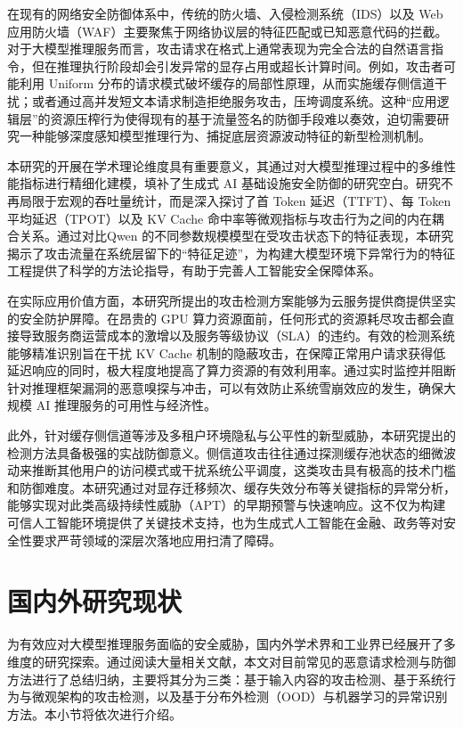 \documentclass[master, vlined]{DissertUESTC}
\begin{document}
	在现有的网络安全防御体系中，传统的防火墙、入侵检测系统（IDS）以及 Web 应用防火墙（WAF）主要聚焦于网络协议层的特征匹配或已知恶意代码的拦截。对于大模型推理服务而言，攻击请求在格式上通常表现为完全合法的自然语言指令，但在推理执行阶段却会引发异常的显存占用或超长计算时间。例如，攻击者可能利用 Uniform 分布的请求模式破坏缓存的局部性原理，从而实施缓存侧信道干扰；或者通过高并发短文本请求制造拒绝服务攻击，压垮调度系统。这种“应用逻辑层”的资源压榨行为使得现有的基于流量签名的防御手段难以奏效，迫切需要研究一种能够深度感知模型推理行为、捕捉底层资源波动特征的新型检测机制。

	本研究的开展在学术理论维度具有重要意义，其通过对大模型推理过程中的多维性能指标进行精细化建模，填补了生成式 AI 基础设施安全防御的研究空白。研究不再局限于宏观的吞吐量统计，而是深入探讨了首 Token 延迟（TTFT）、每 Token 平均延迟（TPOT）以及 KV Cache 命中率等微观指标与攻击行为之间的内在耦合关系。通过对比Qwen 的不同参数规模模型在受攻击状态下的特征表现，本研究揭示了攻击流量在系统层留下的“特征足迹”，为构建大模型环境下异常行为的特征工程提供了科学的方法论指导，有助于完善人工智能安全保障体系。

	在实际应用价值方面，本研究所提出的攻击检测方案能够为云服务提供商提供坚实的安全防护屏障。在昂贵的 GPU 算力资源面前，任何形式的资源耗尽攻击都会直接导致服务商运营成本的激增以及服务等级协议（SLA）的违约。有效的检测系统能够精准识别旨在干扰 KV Cache 机制的隐蔽攻击，在保障正常用户请求获得低延迟响应的同时，极大程度地提高了算力资源的有效利用率。通过实时监控并阻断针对推理框架漏洞的恶意嗅探与冲击，可以有效防止系统雪崩效应的发生，确保大规模 AI 推理服务的可用性与经济性。

	此外，针对缓存侧信道等涉及多租户环境隐私与公平性的新型威胁，本研究提出的检测方法具备极强的实战防御意义。侧信道攻击往往通过探测缓存池状态的细微波动来推断其他用户的访问模式或干扰系统公平调度，这类攻击具有极高的技术门槛和防御难度。本研究通过对显存迁移频次、缓存失效分布等关键指标的异常分析，能够实现对此类高级持续性威胁（APT）的早期预警与快速响应。这不仅为构建可信人工智能环境提供了关键技术支持，也为生成式人工智能在金融、政务等对安全性要求严苛领域的深层次落地应用扫清了障碍。
	
	\section{国内外研究现状}

	为有效应对大模型推理服务面临的安全威胁，国内外学术界和工业界已经展开了多维度的研究探索。通过阅读大量相关文献，本文对目前常见的恶意请求检测与防御方法进行了总结归纳，主要将其分为三类：基于输入内容的攻击检测、基于系统行为与微观架构的攻击检测，以及基于分布外检测（OOD）与机器学习的异常识别方法。本小节将依次进行介绍。 
\end{document}
